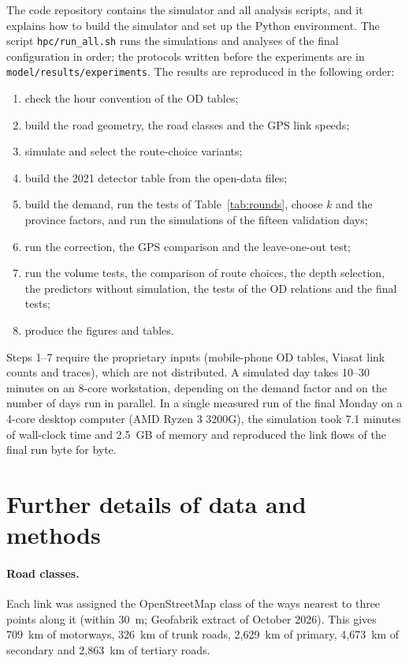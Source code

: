 \documentclass[11pt,a4paper]{article}
\begin{document}
The code repository contains the simulator and all analysis scripts, and it explains how to build the simulator and set up the Python environment. The script \texttt{hpc/run\_all.sh} runs the simulations and analyses of the final configuration in order; the protocols written before the experiments are in \texttt{model/results/experiments}. The results are reproduced in the following order:
\begin{enumerate}
\item check the hour convention of the OD tables;
\item build the road geometry, the road classes and the GPS link speeds;
\item simulate and select the route-choice variants;
\item build the 2021 detector table from the open-data files;
\item build the demand, run the tests of Table~\ref{tab:rounds}, choose $k$ and the province factors, and run the simulations of the fifteen validation days;
\item run the correction, the GPS comparison and the leave-one-out test;
\item run the volume tests, the comparison of route choices, the depth selection, the predictors without simulation, the tests of the OD relations and the final tests;
\item produce the figures and tables.
\end{enumerate}
Steps 1--7 require the proprietary inputs (mobile-phone OD tables, Viasat link counts and traces), which are not distributed. A simulated day takes 10--30 minutes on an 8-core workstation, depending on the demand factor and on the number of days run in parallel. In a single measured run of the final Monday on a 4-core desktop computer (AMD Ryzen 3 3200G), the simulation took 7.1 minutes of wall-clock time and 2.5~GB of memory and reproduced the link flows of the final run byte for byte.


\section{Further details of data and methods}
\label{sec:further}

\paragraph{Road classes.} Each link was assigned the OpenStreetMap class of the ways nearest to three points along it (within 30~m; Geofabrik extract of October 2026). This gives 709~km of motorways, 326~km of trunk roads, 2,629~km of primary, 4,673~km of secondary and 2,863~km of tertiary roads.
\end{document}

